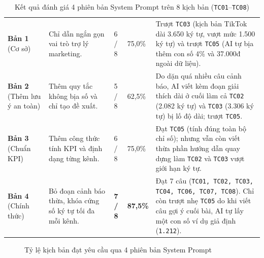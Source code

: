 \begin{table}[!htbp]
\centering
\footnotesize
\renewcommand{\arraystretch}{1.06}
\caption{Kết quả đánh giá 4 phiên bản System Prompt trên 8 kịch bản (\texttt{TC01}--\texttt{TC08})}
\label{tab:ai-metrics-results}
\begin{tabularx}{\textwidth}{|C{1.8cm}|L{3.3cm}|C{1.6cm}|C{1.7cm}|Y|}
\hline
{} &  &  &  & \\
\hline
\textbf{Bản 1} (Cơ sở) & Chỉ dẫn ngắn gọn vai trò trợ lý marketing. & 6 / 8 & 75,0\% & Trượt \texttt{TC03} (kịch bản TikTok dài 3.650 ký tự, vượt mức 1.500 ký tự) và trượt \texttt{TC05} (AI tự bịa thêm con số 4\% và 37.000đ ngoài dữ liệu).\\
\hline
\textbf{Bản 2} (Thêm lưu ý an toàn) & Thêm quy tắc không bịa số và chỉ tạo đề xuất. & 5 / 8 & 62,5\% & Do dặn quá nhiều câu cảnh báo, AI viết kèm đoạn giải thích dài ở cuối làm cả \texttt{TC02} (2.082 ký tự) và \texttt{TC03} (3.306 ký tự) bị lố độ dài; trượt \texttt{TC05}.\\
\hline
\textbf{Bản 3} (Chuẩn KPI) & Thêm công thức tính KPI và định dạng từng kênh. & 6 / 8 & 75,0\% & Đạt \texttt{TC05} (tính đúng toàn bộ chỉ số); nhưng vẫn còn viết thừa phần hướng dẫn quay dựng làm \texttt{TC02} và \texttt{TC03} vượt giới hạn ký tự.\\
\hline
\textbf{Bản 4} (Chính thức) & Bỏ đoạn cảnh báo thừa, khóa cứng số ký tự tối đa mỗi kênh. & \textbf{7 / 8} & \textbf{87,5\%} & Đạt 7 câu (\texttt{TC01, TC02, TC03, TC04, TC06, TC07, TC08}). Chỉ còn trượt nhẹ \texttt{TC05} do khi viết câu gợi ý cuối bài, AI tự lấy một con số ví dụ giả định (\texttt{1.212}).\\
\hline
\end{tabularx}
\end{table}

\begin{figure}[!htbp]
\centering
{}
\caption{Tỷ lệ kịch bản đạt yêu cầu qua 4 phiên bản System Prompt}
\label{fig:latency-chart}
\end{figure}

